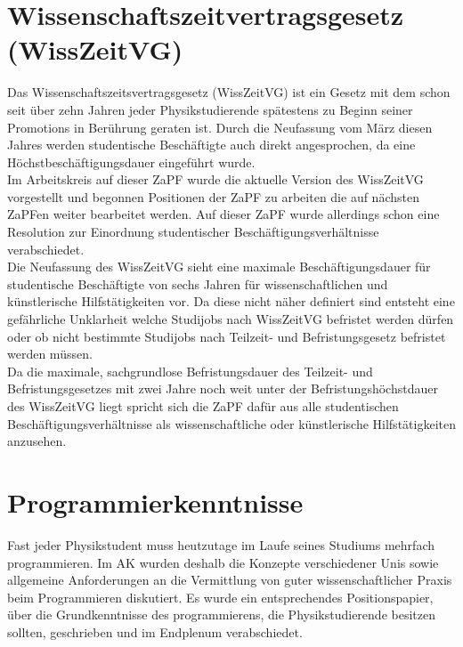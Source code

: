 \section*{Wissenschaftszeitvertragsgesetz (WissZeitVG)}

Das Wissenschaftszeitsvertragsgesetz (WissZeitVG) ist ein Gesetz mit dem schon seit über zehn Jahren jeder Physikstudierende spätestens zu Beginn seiner Promotions in Berührung geraten ist. Durch die Neufassung vom März diesen Jahres werden studentische Beschäftigte auch direkt angesprochen, da eine Höchstbeschäftigungsdauer eingeführt wurde.\\

Im Arbeitskreis auf dieser ZaPF wurde die aktuelle Version des WissZeitVG vorgestellt und begonnen Positionen der ZaPF zu arbeiten die auf nächsten ZaPFen weiter bearbeitet werden. Auf dieser ZaPF wurde allerdings schon eine Resolution zur Einordnung studentischer Beschäftigungsverhältnisse verabschiedet.\\

Die Neufassung des WissZeitVG sieht eine maximale Beschäftigungsdauer für studentische Beschäftigte von sechs Jahren für wissenschaftlichen und künstlerische Hilfstätigkeiten vor. Da diese nicht näher definiert sind entsteht eine gefährliche Unklarheit welche Studijobs nach WissZeitVG befristet werden dürfen oder ob nicht bestimmte Studijobs nach Teilzeit- und Befristungsgesetz befristet werden müssen.\\

Da die maximale, sachgrundlose Befristungsdauer des Teilzeit- und Befristungsgesetzes mit zwei Jahre noch weit unter der Befristungshöchstdauer des WissZeitVG liegt spricht sich die ZaPF dafür aus alle studentischen Beschäftigungsverhältnisse als wissenschaftliche oder künstlerische Hilfstätigkeiten anzusehen. \\

\section*{Programmierkenntnisse}
Fast jeder Physikstudent muss heutzutage im Laufe seines Studiums mehrfach programmieren. Im AK wurden deshalb die Konzepte verschiedener Unis sowie allgemeine Anforderungen an die Vermittlung von guter wissenschaftlicher Praxis beim Programmieren diskutiert. Es wurde ein entsprechendes Positionspapier, über die Grundkenntnisse des programmierens, die Physikstudierende besitzen sollten, geschrieben und im Endplenum verabschiedet.

